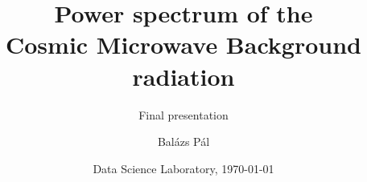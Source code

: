 \title[Cosmic Microwave Background]
{Power spectrum of the\\Cosmic Microwave Background radiation}

\subtitle{Final presentation}

\author[Balázs Pál]
{Balázs Pál}


\date[ELTE 2020]
{Data Science Laboratory, \today}

